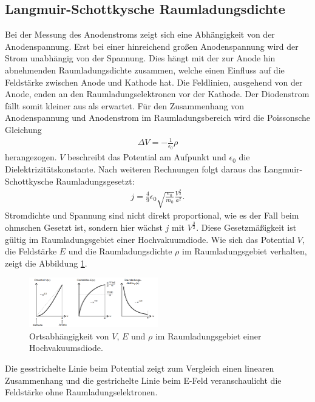 \subsection{Langmuir-Schottkysche Raumladungsdichte}
Bei der Messung des Anodenstroms zeigt sich eine Abhängigkeit von der Anodenspannung.
Erst bei einer hinreichend großen Anodenspannung wird der Strom unabhängig von der Spannung.
Dies hängt mit der zur Anode hin abnehmenden Raumladungsdichte zusammen, welche einen Einfluss
auf die Feldstärke zwischen Anode und Kathode hat. Die Feldlinien, ausgehend von der Anode, enden
an den Raumladungselektronen vor der Kathode. Der Diodenstrom fällt somit kleiner aus als erwartet.
Für den Zusammenhang von Anodenspannung und Anodenstrom im Raumladungsbereich wird die
Poissonsche Gleichung
\begin{align}
\Delta V =-\frac{1}{\epsilon_\mathrm{0}}\rho
\end{align}
herangezogen. $V$ beschreibt das Potential am Aufpunkt und $\epsilon_\mathrm{0}$ die Dielektrizitätskonstante.
Nach weiteren Rechnungen folgt daraus das Langmuir-Schottkysche Raumladungsgesetzt:
\begin{align}
j=\frac{4}{9}\epsilon_\mathrm{0}\sqrt{\frac{e_\mathrm{0}}{m_\mathrm{0}}}\frac{V^{\frac{3}{2}}}{a^2} .\label{eqn:LRS}
\end{align}
Stromdichte und Spannung sind nicht direkt proportional, wie es der Fall beim ohmschen Gesetzt ist, sondern
hier wächst $j$ mit $V^{\frac{3}{2}}$. Diese Gesetzmäßigkeit ist gültig im Raumladungsgebiet einer Hochvakuumdiode.
Wie sich das Potential $V$, die Feldstärke $E$ und die Raumladungsdichte $\rho$ im Raumladungsgebiet
verhalten, zeigt die Abbildung \ref{fig:verlauf}.
\begin{figure}
 \centering
 \includegraphics[width=0.5\textwidth]{verlauf.png}
 \caption{Ortsabhängigkeit von $V$, $E$ und $\rho$ im Raumladungsgebiet einer Hochvakuumsdiode.\cite{sample}}
 \label{fig:verlauf}
 \end{figure}
Die gesstrichelte Linie beim Potential zeigt zum Vergleich einen linearen Zusammenhang
und die gestrichelte Linie beim E-Feld veranschaulicht die Feldstärke ohne Raumladungselektronen.

